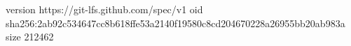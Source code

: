 version https://git-lfs.github.com/spec/v1
oid sha256:2ab92c534647cc8b618ffe53a2140f19580c8cd204670228a26955bb20ab983a
size 212462
